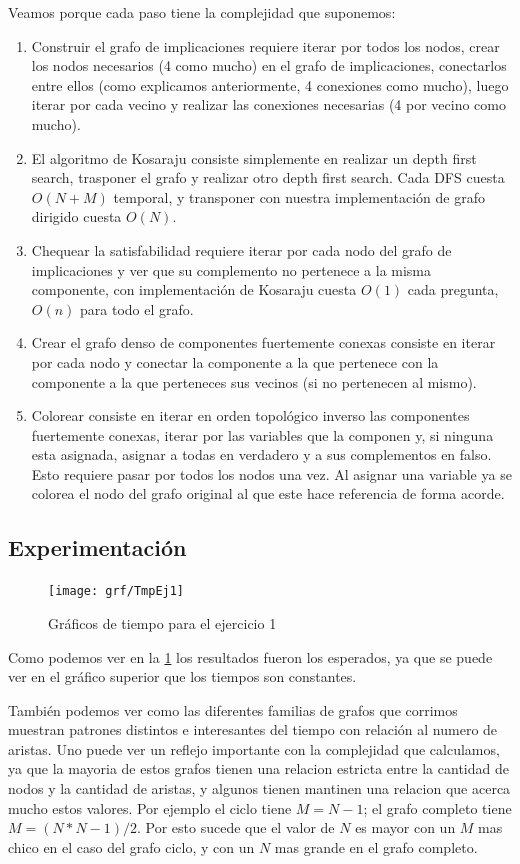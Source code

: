 \documentclass{article}
\theoremstyle{definition}
\theoremstyle{remark}
\begin{document}
Veamos porque cada paso tiene la complejidad que suponemos:
\begin{enumerate}
\item Construir el grafo de implicaciones requiere iterar por todos los nodos, crear los nodos necesarios (4 como mucho) en el grafo de implicaciones, conectarlos entre ellos (como explicamos anteriormente, 4 conexiones como mucho), luego iterar por cada vecino y realizar las conexiones necesarias (4 por vecino como mucho).
\item El algoritmo de Kosaraju consiste simplemente en realizar un depth first search, trasponer el grafo y realizar otro depth first search. Cada DFS cuesta $O(N+M)$ temporal, y transponer con nuestra implementación de grafo dirigido cuesta $O(N)$.
\item Chequear la satisfabilidad requiere iterar por cada nodo del grafo de implicaciones y ver que su complemento no pertenece a la misma componente, con implementación de Kosaraju cuesta $O(1)$ cada pregunta, $O(n)$ para todo el grafo.
\item Crear el grafo denso de componentes fuertemente conexas consiste en iterar por cada nodo y conectar la componente a la que pertenece con la componente a la que perteneces sus vecinos (si no pertenecen al mismo).
\item Colorear consiste en iterar en orden topológico inverso las componentes fuertemente conexas, iterar por las variables que la componen y, si ninguna esta asignada, asignar a todas en verdadero y a sus complementos en falso. Esto requiere pasar por todos los nodos una vez. Al asignar una variable ya se colorea el nodo del grafo original al que este hace referencia de forma acorde.
\end{enumerate}

\subsection{Experimentación}

\begin{figure}
\centering
\texttt{[image: grf/TmpEj1]}
\caption{Gráficos de tiempo para el ejercicio 1}
\label{ex1:time}
\end{figure}

Como podemos ver en la \ref{ex1:time} los resultados fueron los esperados, ya que se puede ver en el gráfico superior que los tiempos son constantes. 

También podemos ver como las diferentes familias de grafos que corrimos muestran patrones distintos e interesantes del tiempo con relación al numero de aristas. Uno puede ver un reflejo importante con la complejidad que calculamos, ya que la mayoria de estos grafos tienen una relacion estricta entre la cantidad de nodos y la cantidad de aristas, y algunos tienen mantinen una relacion que acerca mucho estos valores. Por ejemplo el ciclo tiene $M = N - 1$; el grafo completo tiene $M = (N*N-1)/2$. Por esto sucede que el valor de $N$ es mayor con un $M$ mas chico en el caso del grafo ciclo, y con un $N$ mas grande en el grafo completo.
\end{document}
